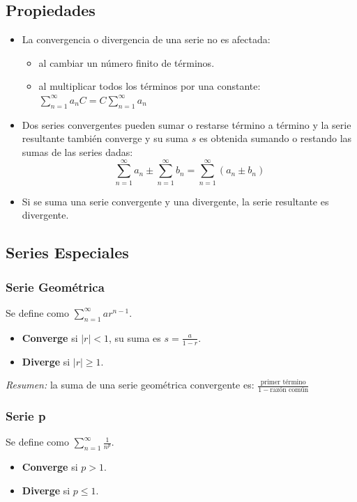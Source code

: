 \documentclass[a4paper,12pt]{article}
\begin{document}
\subsection{Propiedades}
\begin{itemize}
    \item La convergencia o divergencia de una serie no es afectada:
    \begin{itemize}
        \item al cambiar un número finito de términos.
        \item al multiplicar todos los términos por una constante: $\sum_{n=1}^{\infty} a_n  C = C \sum_{n=1}^{\infty} a_n$
    \end{itemize} 
    \item Dos series convergentes pueden sumar o restarse término a término y la serie resultante también converge y su suma $s$ es obtenida sumando o restando las sumas de las series dadas:
    $$\sum_{n=1}^{\infty} a_n \pm \sum_{n=1}^{\infty} b_n = \sum_{n=1}^{\infty} (a_n \pm b_n)$$
    \item Si se suma una serie convergente y una divergente, la serie resultante es divergente.
\end{itemize}

\subsection{Series Especiales}

\subsubsection{Serie Geométrica}
Se define como $\sum_{n=1}^{\infty} ar^{n-1}$. 
\begin{itemize}
    \item \textbf{Converge} si $|r| < 1$, su suma es $s = \frac{a}{1-r}$.
    \item \textbf{Diverge} si $|r| \geqslant 1$.
\end{itemize}
\textit{Resumen:} la suma de una serie geométrica convergente es: $\frac{\text{primer término}}{1 - \text{razón común}}$

\subsubsection{Serie p}
Se define como $\sum_{n=1}^{\infty} \frac{1}{n^p}$.
\begin{itemize}
    \item \textbf{Converge} si $p > 1$.
    \item \textbf{Diverge} si $p \leqslant 1$.
\end{itemize}
\end{document}
